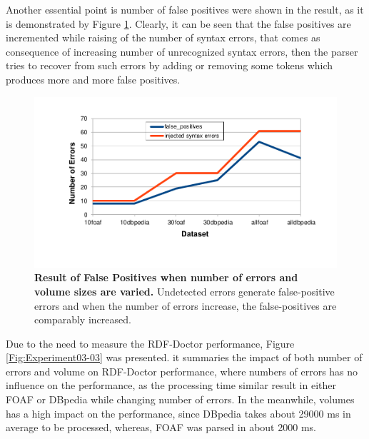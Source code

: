 Another essential point is number of false positives were shown in the result, as it is demonstrated  by Figure \ref{Fig:Experiment03-02}. Clearly, it can be seen that the false positives  are incremented while raising of the number of syntax errors, that comes as consequence of increasing number of unrecognized syntax errors, then the parser tries to recover from such errors by adding or removing some tokens which produces more and more false positives.   




\begin{figure}[ht]
\begin{center}
		\includegraphics[scale=0.8,angle=0]{images/Experiment03-02.pdf}
		\setlength\belowcaptionskip{-5mm}
		\setlength\abovecaptionskip{-10mm}
		\caption{\textbf{Result of False Positives when number of errors and volume sizes are varied.} Undetected errors generate false-positive errors and when the number of errors increase, the false-positives are comparably increased.}
				\label{Fig:Experiment03-02}
\end{center}
\end{figure}

Due to the need to measure the RDF-Doctor performance, Figure \ref{Fig:Experiment03-03} was presented. it summaries the impact of both number of errors and volume on RDF-Doctor performance, where numbers of errors has no influence on the performance, as the processing time similar result in either FOAF or DBpedia while changing number of errors. In the meanwhile, volumes has a high impact on the performance, since  DBpedia  takes about 29000 ms in average to be processed, whereas, FOAF was parsed in about 2000 ms.   

